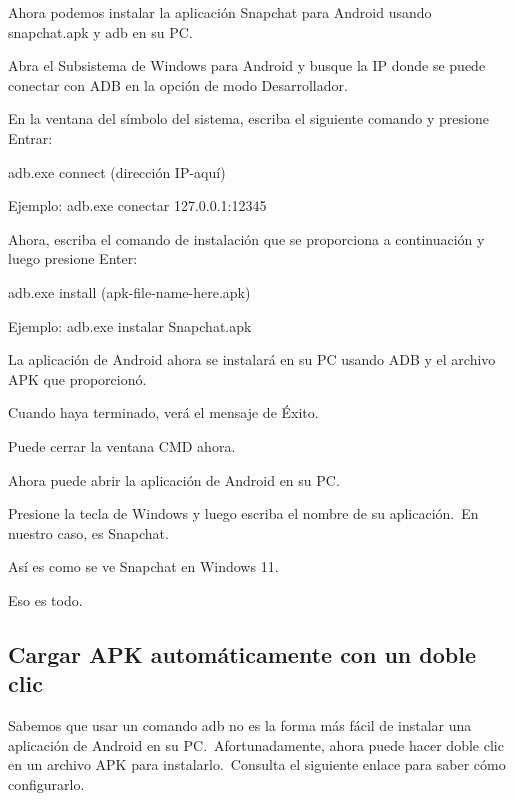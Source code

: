 \documentclass[
  letterpaper,
  DIV=11,
  numbers=noendperiod]{scrartcl}
\begin{document}
Ahora podemos instalar la aplicación Snapchat para Android usando
snapchat.apk y adb en su PC.

Abra el Subsistema de Windows para Android y busque la IP donde se puede
conectar con ADB en la opción de modo Desarrollador.

En la ventana del símbolo del sistema, escriba el siguiente comando y
presione Entrar:

adb.exe connect (dirección IP-aquí)

Ejemplo: adb.exe conectar 127.0.0.1:12345

Ahora, escriba el comando de instalación que se proporciona a
continuación y luego presione Enter:

adb.exe install (apk-file-name-here.apk)

Ejemplo: adb.exe instalar Snapchat.apk

La aplicación de Android ahora se instalará en su PC usando ADB y el
archivo APK que proporcionó.

Cuando haya terminado, verá el mensaje de Éxito.

Puede cerrar la ventana CMD ahora.

Ahora puede abrir la aplicación de Android en su PC.

Presione la tecla de Windows y luego escriba el nombre de su
aplicación.~En nuestro caso, es Snapchat.

Así es como se ve Snapchat en Windows 11.

Eso es todo.

\hypertarget{cargar-apk-automuxe1ticamente-con-un-doble-clic}{%
\subsection{Cargar APK automáticamente con un doble
clic}\label{cargar-apk-automuxe1ticamente-con-un-doble-clic}}

Sabemos que usar un comando adb no es la forma más fácil de instalar una
aplicación de Android en su PC.~Afortunadamente, ahora puede hacer doble
clic en un archivo APK para instalarlo.~Consulta el siguiente enlace
para saber cómo configurarlo.


\printbibliography
\end{document}
